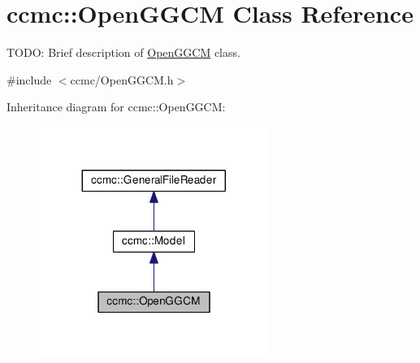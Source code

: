 \hypertarget{classccmc_1_1_open_g_g_c_m}{\section{ccmc\-:\-:Open\-G\-G\-C\-M Class Reference}
\label{classccmc_1_1_open_g_g_c_m}
}


T\-O\-D\-O\-: Brief description of \hyperlink{classccmc_1_1_open_g_g_c_m}{Open\-G\-G\-C\-M} class.  




{\ttfamily \#include $<$ccmc/\-Open\-G\-G\-C\-M.\-h$>$}



Inheritance diagram for ccmc\-:\-:Open\-G\-G\-C\-M\-:
\nopagebreak
\begin{figure}[H]
\begin{center}
\leavevmode
\includegraphics[width=212pt]{classccmc_1_1_open_g_g_c_m__inherit__graph}
\end{center}
\end{figure}


